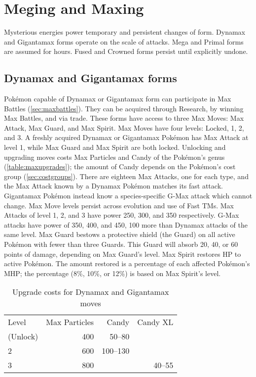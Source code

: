 \chapter{Meging and Maxing}
\label{chap:megmax}
Mysterious energies power temporary and persistent changes of form.
Dynamax and Gigantamax forms operate on the scale of attacks.
Mega and Primal forms are assumed for hours.
Fused and Crowned forms persist until explicitly undone.

\section{Dynamax and Gigantamax forms}
\label{sec:dmaxgmax}
Pokémon capable of Dynamax or Gigantamax form can participate in Max Battles (\autoref{sec:maxbattles}).
They can be acquired through Research, by winning Max Battles, and via trade.
These forms have access to three Max Moves: Max Attack, Max Guard, and Max Spirit.
Max Moves have four levels: Locked, 1, 2, and 3.
A freshly acquired Dynamax or Gigantamax Pokémon has Max Attack at level 1, while Max Guard and Max Spirit are both locked.
Unlocking and upgrading moves costs Max Particles and Candy of the Pokémon's genus (\autoref{table:maxupgrades});
 the amount of Candy depends on the Pokémon's cost group (\autoref{sec:costgroups}).
There are eighteen Max Attacks, one for each type, and the Max Attack known by a Dynamax Pokémon matches its fast attack.
Gigantamax Pokémon instead know a species-specific G-Max attack which cannot change.
Max Move levels persist across evolution and use of Fast TMs.
Max Attacks of level 1, 2, and 3 have power 250, 300, and 350
  respectively.
G-Max attacks have power of 350, 400, and 450, 100 more than Dynamax attacks of the same level.
Max Guard bestows a protective shield (the Guard) on all active Pokémon
  with fewer than three Guards.
This Guard will absorb 20, 40, or 60 points of damage, depending on Max Guard's level.
Max Spirit restores HP to active Pokémon.
The amount restored is a percentage of each affected Pokémon's MHP\@;
  the percentage (8\%, 10\%, or 12\%) is based on Max Spirit's level.
\begin{table}
\centering
\begin{tabular}{lrrr}
  Level & Max Particles & Candy & Candy XL\\
  \Midrule
  1 (Unlock) & 400 & 50--80 &\\
  2          & 600 & 100--130 &\\
  3          & 800 & & 40--55\\
\end{tabular}
\caption{Upgrade costs for Dynamax and Gigantamax moves}
\label{table:maxupgrades}
\end{table}

